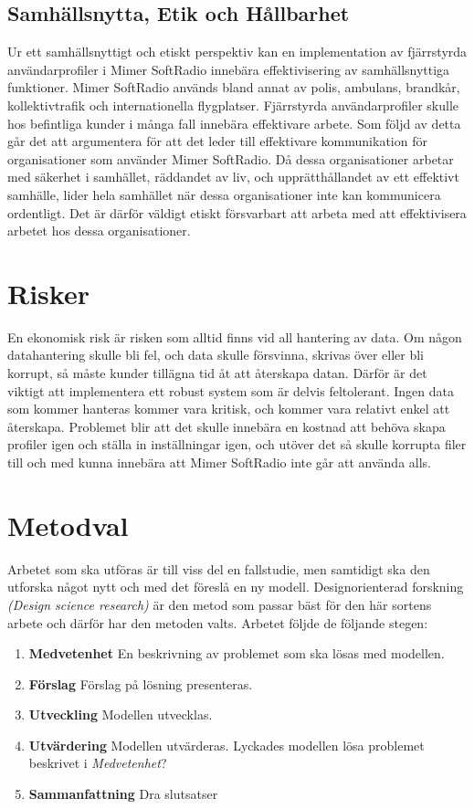 \subsection{Samhällsnytta, Etik och Hållbarhet}

Ur ett samhällsnyttigt och etiskt perspektiv kan en implementation av fjärrstyrda användarprofiler i Mimer SoftRadio innebära effektivisering av samhällsnyttiga funktioner. Mimer SoftRadio används bland annat av polis, ambulans, brandkår, kollektivtrafik och internationella flygplatser. Fjärrstyrda användarprofiler skulle hos befintliga kunder i många fall innebära effektivare arbete. Som följd av detta går det att argumentera för att det leder till effektivare kommunikation för organisationer som använder Mimer SoftRadio. Då dessa organisationer arbetar med säkerhet i samhället, räddandet av liv, och upprätthållandet av ett effektivt samhälle, lider hela samhället när dessa organisationer inte kan kommunicera ordentligt. Det är därför väldigt etiskt försvarbart att arbeta med att effektivisera arbetet hos dessa organisationer.

\section{Risker}
\label{sec:intro:risker}
En ekonomisk risk är risken som alltid finns vid all hantering av data. Om någon datahantering skulle bli fel, och data skulle försvinna, skrivas över eller bli korrupt, så måste kunder tillägna tid åt att återskapa datan. Därför är det viktigt att implementera ett robust system som är delvis feltolerant. Ingen data som kommer hanteras kommer vara kritisk, och kommer vara relativt enkel att återskapa. Problemet blir att det skulle innebära en kostnad att behöva skapa profiler igen och ställa in inställningar igen, och utöver det så skulle korrupta filer till och med kunna innebära att Mimer SoftRadio inte går att använda alls.

\section{Metodval}
\label{sec:intro:metodval}
Arbetet som ska utföras är till viss del en fallstudie, men samtidigt ska den utforska något nytt och med det föreslå en ny modell. Designorienterad forskning \textit{(Design science research)} är den metod som passar bäst för den här sortens arbete och därför har den metoden valts.
\noindent
Arbetet följde de följande stegen:

\begin{enumerate}
	\item \textbf{Medvetenhet} En beskrivning av problemet som ska lösas med modellen.
	\item \textbf{Förslag} Förslag på lösning presenteras.
	\item \textbf{Utveckling} Modellen utvecklas.
	\item \textbf{Utvärdering} Modellen utvärderas. Lyckades modellen lösa problemet beskrivet i \textit{Medvetenhet}?
	\item \textbf{Sammanfattning} Dra slutsatser
\end{enumerate}

